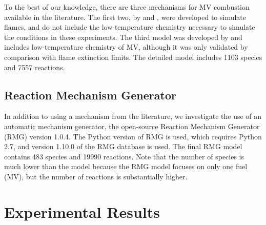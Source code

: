 \documentclass[12pt]{../ussci}
\begin{document}
To the best of our knowledge, there are three mechanisms for MV combustion
available in the literature. The first two, by \textcite{Dmitriev2015} and
\textcite{Korobeinichev2015}, were developed to simulate flames, and do not
include the low-temperature chemistry necessary to simulate the conditions in
these experiments. The third model was developed by \textcite{Dievart2013} and
includes low-temperature chemistry of MV, although it was only validated by
comparison with flame extinction limits.
The detailed \textcite{Dievart2013} model includes 1103 species and 7557
reactions.

\subsection{Reaction Mechanism Generator}\label{sec:reaction-mechanism-generator}

In addition to using a mechanism from the literature, we investigate the use of
an automatic mechanism generator, the open-source Reaction Mechanism Generator
(RMG) \autocite{Allen2012} version 1.0.4. The Python version of RMG is used,
which requires Python 2.7, and version 1.10.0 of the RMG database is used. The
final RMG model contains 483 species and 19990 reactions. Note that the number
of species is much lower than the \textcite{Dievart2013} model because the RMG
model focuses on only one fuel (MV), but the number of reactions is
substantially higher.

\section{Experimental Results}\label{sec:experimental-results}
\end{document}
